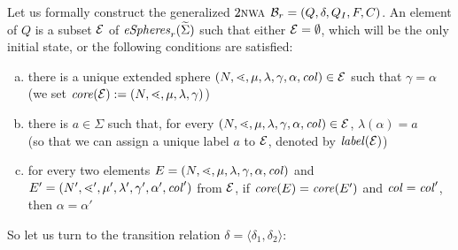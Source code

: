 \documentclass{LMCS}
\begin{document}
Let us formally construct the generalized $2\textsc{nwa}$
$\mathcal{B}_r=(Q,\delta,Q_I,F,C)$. An element of $Q$ is a subset $\mathcal{E}$ of
$\mathit{eSpheres}_r(\widetilde{\Sigma})$ such that either $\mathcal{E} = \emptyset$, which
will be the only initial state, or the following conditions are satisfied:
\begin{enumerate}[(a)]
\item there is a unique extended sphere
  $(N,\mathord{\lessdot},\mu,\lambda,\gamma,\alpha,\mathit{col}) \in \mathcal{E}$ such that $\gamma
  = \alpha$\\(we set $\mathit{core}(\mathcal{E}) := (N,\mathord{\lessdot},\mu,\lambda,\gamma)$)
\item there is $a \in \Sigma$ such that, for every
  $(N,\mathord{\lessdot},\mu,\lambda,\gamma,\alpha,\mathit{col}) \in \mathcal{E}$,
  $\lambda(\alpha)=a$\\(so that we can assign a unique label $a$ to $\mathcal{E}$,
  denoted by $\mathit{label}(\mathcal{E})$)
\item for every two elements
  $E=(N,\mathord{\lessdot},\mu,\lambda,\gamma,\alpha,\mathit{col})$ and $E' =
  (N',\mathord{\lessdot}',\mu',\lambda',\gamma',\alpha',\mathit{col}')$ from $\mathcal{E}$, if
  $\mathit{core}(E) = \mathit{core}(E')$ and $\mathit{col} = \mathit{col}'$, then $\alpha =
  \alpha'$
\end{enumerate}
So let us turn to the transition relation $\delta = \langle \delta_1,\delta_2
\rangle$:
\end{document}
